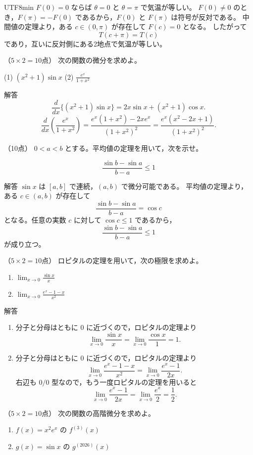 \documentclass[a4paper,12pt]{article}
\newcommand{\problem}[2]{\par\vspace{0.9em}\noindent{\large 問題 #1}\quad（#2点）\quad\ignorespaces}
\newcommand{\answer}{\par\noindent 解答\quad}
\begin{document}
\begin{CJK}{UTF8}{min}
$F(0)=0$ ならば $\theta=0$ と $\theta=\pi$ で気温が等しい。
$F(0)\neq 0$ のとき，$F(\pi)=-F(0)$ であるから，$F(0)$ と $F(\pi)$ は符号が反対である。
中間値の定理より，ある $c\in(0,\pi)$ が存在して $F(c)=0$ となる。
したがって
\[
T(c+\pi)=T(c)
\]
であり，互いに反対側にある2地点で気温が等しい。

\problem{4}{$5\times 2=10$}
次の関数の微分を求めよ。

(1) $\displaystyle  (x^2+1)\sin x$ 
(2) $\displaystyle \frac{e^x}{1+x^2}$ 

\answer
\[
\frac{d}{dx}\{(x^2+1)\sin x\}
=2x\sin x+(x^2+1)\cos x.
\]
\[
\frac{d}{dx}\left(\frac{e^x}{1+x^2}\right)
=\frac{e^x(1+x^2)-2xe^x}{(1+x^2)^2}
=\frac{e^x(x^2-2x+1)}{(1+x^2)^2}.
\]

\problem{5}{10}
$0<a<b$ とする。平均値の定理を用いて，次を示せ。

\[
\frac{\sin b-\sin a}{b-a}\leq 1
\]

\answer
$\sin x$ は $[a,b]$ で連続，$(a,b)$ で微分可能である。
平均値の定理より，ある $c\in(a,b)$ が存在して
\[
\frac{\sin b-\sin a}{b-a}=\cos c
\]
となる。任意の実数 $c$ に対して $\cos c\leq 1$ であるから，
\[
\frac{\sin b-\sin a}{b-a}\leq 1
\]
が成り立つ。

\problem{6}{$5\times 2=10$}
ロピタルの定理を用いて，次の極限を求めよ。

\begin{enumerate}[label=(\alph*)]
\item $\displaystyle \lim_{x\to 0}\frac{\sin x}{x}$ 
\item $\displaystyle \lim_{x\to 0}\frac{e^x-1-x}{x^2}$ 
\end{enumerate}

\answer
\begin{enumerate}[label=(\alph*)]
\item 分子と分母はともに $0$ に近づくので，ロピタルの定理より
\[
\lim_{x\to 0}\frac{\sin x}{x}
=\lim_{x\to 0}\frac{\cos x}{1}
=1.
\]
\item 分子と分母はともに $0$ に近づくので，ロピタルの定理より
\[
\lim_{x\to 0}\frac{e^x-1-x}{x^2}
=\lim_{x\to 0}\frac{e^x-1}{2x}.
\]
右辺も $0/0$ 型なので，もう一度ロピタルの定理を用いると
\[
\lim_{x\to 0}\frac{e^x-1}{2x}
=\lim_{x\to 0}\frac{e^x}{2}
=\frac12.
\]
\end{enumerate}

\problem{7}{$5\times 2=10$}
次の関数の高階微分を求めよ。

\begin{enumerate}[label=(\alph*)]
\item $f(x)=x^2e^x$ の $f^{(3)}(x)$ 
\item $g(x)=\sin x$ の $g^{(2026)}(x)$ 
\end{enumerate}


\end{CJK}
\end{document}
